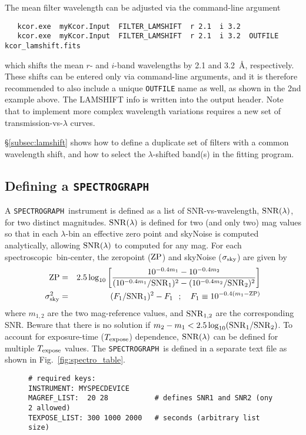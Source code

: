 \documentclass[12pt]{article}
\newcommand{\SPEC}{{\tt SPECTROGRAPH}}
\newcommand{\SNRlam}{{\rm SNR}(\lambda)}
\newcommand{\Texpose}{T_{\rm expose}}
\newcommand{\ZP}{{\rm ZP}}
\newcommand{\sigSky}{\sigma_{\rm sky}}
\newcommand{\spec}{spectroscopic}
\newcommand{\lam}{\lambda}
\begin{document}
{The mean filter wavelength can be adjusted via the command-line
argument
\begin{verbatim}
   kcor.exe  myKcor.Input  FILTER_LAMSHIFT  r 2.1  i 3.2
   kcor.exe  myKcor.Input  FILTER_LAMSHIFT  r 2.1  i 3.2  OUTFILE kcor_lamshift.fits
\end{verbatim}
which shifts the mean $r$- and $i$-band  wavelengths
by 2.1 and 3.2~\AA, respectively. These shifts can be entered
only via command-line arguments, and it is therefore recommended
to also include a unique {\tt OUTFILE} name as well, as shown
in the 2nd example above. The LAMSHIFT info is written into
the output header. Note that to implement more complex wavelength
variations requires a new set of 
transmission-vs-$\lam$ curves.


\S\ref{subsec:lamshift} shows how to define a duplicate set
of filters with a common wavelength shift, and how to select
the $\lambda$-shifted band(s) in the fitting program.


   \clearpage
\subsection{Defining a {\SPEC} }
\label{subsec:kcor_spectrograph}


A \SPEC\ instrument is defined as a list of SNR-vs-wavelength,
$\SNRlam$, for two distinct magnitudes. 
$\SNRlam$ is defined for two (and only two) mag values so that in each
$\lam$-bin an effective zero point and skyNoise is 
computed analytically, allowing $\SNRlam$ to computed for any mag.
For each \spec\ bin-center, the zeropoint ($\ZP$) and skyNoise ($\sigSky$) 
are given by
%
\begin{eqnarray}
   \ZP & = &
      2.5\log_{10}\left[ \frac{  10^{-0.4m_1} - 10^{-0.4m_2} }
           {  (10^{-0.4m_1}/{\rm SNR}_1)^2 - (10^{-0.4m_2}/{\rm SNR}_2)^2 }
      \right]
     \\
   \sigSky^2 & = & (F_1/{\rm SNR}_1)^2 - F_1 ~~ ; ~~~ 
            F_1 \equiv 10^{-0.4(m_1-\ZP)}
  \label{eq:ZPspec}
\end{eqnarray}
%
where $m_{1,2}$ are the two mag-reference values,
and ${\rm SNR}_{1,2}$ are the corresponding SNR.
Beware that there is no solution if
$m_2-m_1 < 2.5\log_{10}({\rm SNR}_1/{\rm SNR}_2)$.
%
To account for exposure-time ($\Texpose$) dependence, 
$\SNRlam$ can be defined for multiple $\Texpose$ values.
The \SPEC\ is defined in a separate text file as shown 
in Fig.~\ref{fig:spectro_table}.
%
\begin{figure} [ht] 
\begin{center}
\begin{Verbatim}[frame=single]
# required keys:
INSTRUMENT: MYSPECDEVICE
MAGREF_LIST:  20 28           # defines SNR1 and SNR2 (ony 2 allowed)
TEXPOSE_LIST: 300 1000 2000   # seconds (arbitrary list size)


\end{Verbatim}
\end{center}
\end{figure}}
\end{document}
